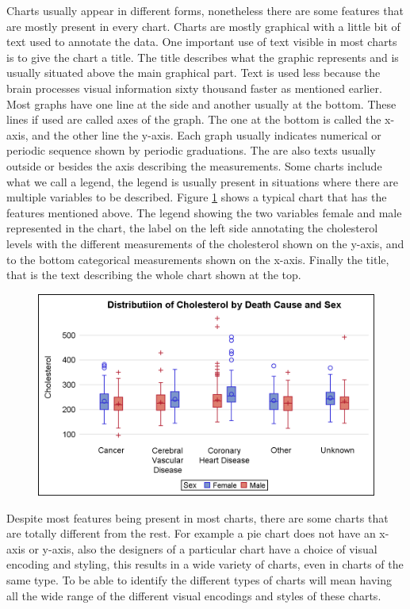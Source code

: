 \documentclass[12pt, a4paper,oneside]{report}
\begin{document}
Charts usually appear in different forms, nonetheless there are some features that are mostly present in every chart. Charts are mostly graphical with a little bit of text used to annotate the data. One important use of text visible in most charts is to give the chart a title. The title describes what the graphic represents and is usually situated above the main graphical part. Text is used less because the brain processes visual information sixty thousand faster \cite{humaneye} as mentioned earlier. Most graphs have one line at the side and another usually at the bottom. These lines if used are called axes of the graph. The one at the bottom is called the x-axis, and the other line the y-axis. Each graph usually indicates numerical or periodic sequence shown by periodic graduations. The are also texts usually outside or besides the axis describing the measurements.
Some charts include what we call a legend, the legend is usually present in situations where there are multiple variables to be described. Figure \ref{fig:boxy} shows a typical chart that has the features mentioned above. The legend showing the two variables female and male represented in the chart, the label on the left side annotating the cholesterol levels with the different measurements of the cholesterol shown on the y-axis, and to the bottom categorical measurements shown on the x-axis. Finally the title, that is the text describing the whole chart shown at the top. 

\begin{figure}[!htb]
	\centering
	\includegraphics [scale=1.0] {box_color.png}
	\label{fig:boxy}
\end{figure}

Despite most features being present in most charts, there are some charts that are totally different from the rest. For example a pie chart does not have an x-axis or y-axis, also the designers of a particular chart have a choice of visual encoding and styling, this results in a wide variety of charts, even in charts of the same type. To be able to identify the different types of charts will mean having all the wide range of the different visual encodings and styles of these charts.
\end{document}
